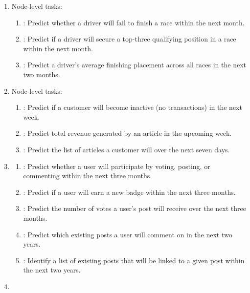 \documentclass{article}
\theoremstyle{plain}
\theoremstyle{definition}
\theoremstyle{remark}
\begin{document}
\begin{enumerate}
    
\item \fone

    Node-level tasks:
    \begin{enumerate}
    \item \driverDNF: Predict whether a driver will fail to finish a race within the next month.
    \item \driverTopThree: Predict if a driver will secure a top-three qualifying position in a race within the next month.
    \item \driverPosition: Predict a driver's average finishing placement across all races in the next two months.
    \end{enumerate}


\item \handm

    Node-level tasks:
    \begin{enumerate}
    \item \userChurn: Predict if a customer will become inactive (no transactions) in the next week.
    \item \itemSales: Predict total revenue generated by an article in the upcoming week.
    \item \userItemPurchase: Predict the list of articles a customer will over the next seven days.
    \end{enumerate}

\item \stackex

    \begin{enumerate}
    \item \userEngage: Predict whether a user will participate by voting, posting, or commenting within the next three months.
    \item \userBadge: Predict if a user will earn a new badge within the next three months.
    \item \postVotes: Predict the number of votes a user’s post will receive over the next three months.
    \item \userPostComment: Predict which existing posts a user will comment on in the next two years.
    \item \postPostLinked: Identify a list of existing posts that will be linked to a given post within the next two years.
    \end{enumerate}

\item \trials


\end{enumerate}
\end{document}
